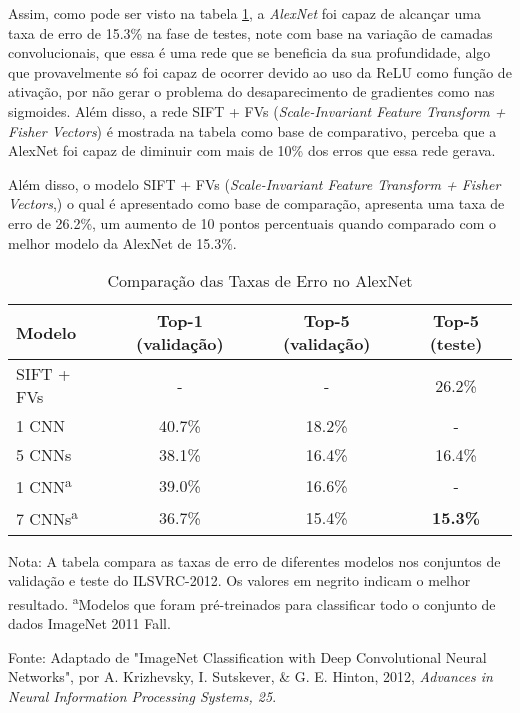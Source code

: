Assim, como pode ser visto na tabela \ref{tab:desempenho-alexnet}, a \textit{AlexNet} foi capaz de alcançar uma taxa de erro de 15.3\% na fase de testes, note com base na variação de camadas convolucionais, que essa é uma rede que se beneficia da sua profundidade, algo que provavelmente só foi capaz de ocorrer devido ao uso da ReLU como função de ativação, por não gerar o problema do desaparecimento de gradientes como nas sigmoides. Além disso, a rede SIFT + FVs (\textit{Scale-Invariant Feature Transform + Fisher Vectors}) é mostrada na tabela como base de comparativo, perceba que a AlexNet foi capaz de diminuir com mais de 10\% dos erros que essa rede gerava.

Além disso, o modelo SIFT + FVs (\textit{Scale-Invariant Feature Transform + Fisher Vectors},) o qual é apresentado como base de comparação, apresenta uma taxa de erro de 26.2\%, um aumento de 10 pontos percentuais quando comparado com o melhor modelo da AlexNet de 15.3\%.

\begin{table}[ht]
    \centering
    \begin{threeparttable}
        \caption{Comparação das Taxas de Erro no AlexNet}
        \label{tab:desempenho-alexnet}
        \begin{tabular}{lccc}
            \toprule
            \textbf{Modelo} & \textbf{Top-1 (validação)} & \textbf{Top-5 (validação)} & \textbf{Top-5 (teste)} \\
            \midrule
            SIFT + FVs & -    & -      & 26.2\% \\
            1 CNN      & 40.7\% & 18.2\% & -      \\
            5 CNNs     & 38.1\% & 16.4\% & 16.4\% \\
            1 CNN\textsuperscript{a}      & 39.0\% & 16.6\% & -      \\
            7 CNNs\textsuperscript{a}     & 36.7\% & 15.4\% & \textbf{15.3\%} \\
            \bottomrule
        \end{tabular}
        
        \begin{tablenotes}[para] %
            \small %
            \item[] Nota: A tabela compara as taxas de erro de diferentes modelos nos conjuntos de validação e teste do ILSVRC-2012. Os valores em negrito indicam o melhor resultado. \textsuperscript{a}Modelos que foram pré-treinados para classificar todo o conjunto de dados ImageNet 2011 Fall.
            \item[] Fonte: Adaptado de "ImageNet Classification with Deep Convolutional Neural Networks", por A. Krizhevsky, I. Sutskever, \& G. E. Hinton, 2012, \textit{Advances in Neural Information Processing Systems, 25}.
        \end{tablenotes}

    \end{threeparttable}
\end{table}


